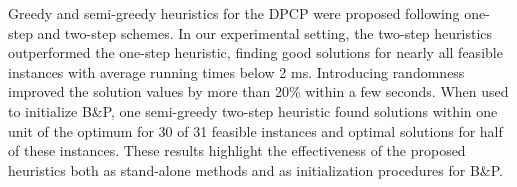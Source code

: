 \documentclass[preprint, 11pt, authoryear]{elsarticle}
\newcommand{\setcoveringform}{\text{DPCP-SCF}}
\newcommand{\setcoveringformLRM}{\text{LR}^{\text{M}}_{\text{ext}}}
\begin{document}
Greedy and semi-greedy heuristics for the DPCP were proposed following one-step and two-step schemes. 
In our experimental setting, the two-step heuristics outperformed the one-step heuristic, finding good solutions for nearly all feasible instances with average running times below 2 ms. Introducing randomness improved the solution values by more than 20\% within a few seconds. When used to initialize B\&P, one semi-greedy two-step heuristic found solutions within one unit of the optimum for 30 of 31 feasible instances and optimal solutions for half of these instances. These results highlight the effectiveness of the proposed heuristics both as stand-alone methods and as initialization procedures for B\&P.





\end{document}
